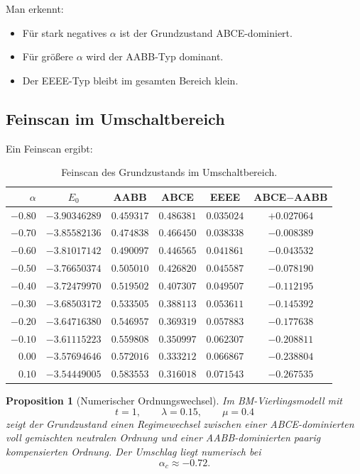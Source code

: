 \documentclass[11pt,a4paper]{article}
\newtheorem{proposition}[definition]{Proposition}
\begin{document}
	Man erkennt:
	\begin{itemize}
		\item Für stark negatives \(\alpha\) ist der Grundzustand ABCE-dominiert.
		\item Für größere \(\alpha\) wird der AABB-Typ dominant.
		\item Der EEEE-Typ bleibt im gesamten Bereich klein.
	\end{itemize}
	
	\subsection{Feinscan im Umschaltbereich}
	
	Ein Feinscan ergibt:
	
	\begin{table}[h]
		\centering
		\begin{tabular}{rccccc}
			\toprule
			$\alpha$ & $E_0$ & AABB & ABCE & EEEE & ABCE$-$AABB \\
			\midrule
			$-0.80$ & $-3.90346289$ & $0.459317$ & $0.486381$ & $0.035024$ & $+0.027064$ \\
			$-0.70$ & $-3.85582136$ & $0.474838$ & $0.466450$ & $0.038338$ & $-0.008389$ \\
			$-0.60$ & $-3.81017142$ & $0.490097$ & $0.446565$ & $0.041861$ & $-0.043532$ \\
			$-0.50$ & $-3.76650374$ & $0.505010$ & $0.426820$ & $0.045587$ & $-0.078190$ \\
			$-0.40$ & $-3.72479970$ & $0.519502$ & $0.407307$ & $0.049507$ & $-0.112195$ \\
			$-0.30$ & $-3.68503172$ & $0.533505$ & $0.388113$ & $0.053611$ & $-0.145392$ \\
			$-0.20$ & $-3.64716380$ & $0.546957$ & $0.369319$ & $0.057883$ & $-0.177638$ \\
			$-0.10$ & $-3.61115223$ & $0.559808$ & $0.350997$ & $0.062307$ & $-0.208811$ \\
			$0.00$  & $-3.57694646$ & $0.572016$ & $0.333212$ & $0.066867$ & $-0.238804$ \\
			$0.10$  & $-3.54449005$ & $0.583553$ & $0.316018$ & $0.071543$ & $-0.267535$ \\
			\bottomrule
		\end{tabular}
		\caption{Feinscan des Grundzustands im Umschaltbereich.}
	\end{table}
	
	\begin{proposition}[Numerischer Ordnungswechsel]
		Im BM-Vierlingsmodell mit
		\[
		t=1,\qquad \lambda=0.15,\qquad \mu=0.4
		\]
		zeigt der Grundzustand einen Regimewechsel zwischen einer ABCE-dominierten voll gemischten neutralen Ordnung und einer AABB-dominierten paarig kompensierten Ordnung. Der Umschlag liegt numerisch bei
		\[
		\alpha_c\approx -0.72.
		\]
	\end{proposition}
	
\end{document}
